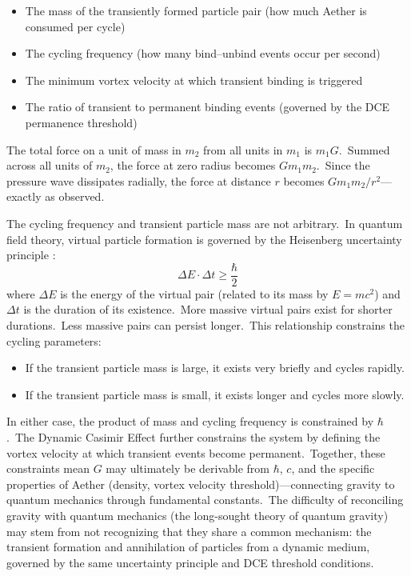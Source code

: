 ﻿\documentclass[12pt,letterpaper]{article}
\begin{document}
\begin{itemize}[leftmargin=2em]
  \item The mass of the transiently formed particle pair (how much Aether is consumed per cycle)
  \item The cycling frequency (how many bind--unbind events occur per second)
  \item The minimum vortex velocity at which transient binding is triggered
  \item The ratio of transient to permanent binding events (governed by the DCE permanence
    threshold)
\end{itemize}

The total force on a unit of mass in $m_2$ from all units in $m_1$ is $m_1 G$.\ Summed across
all units of $m_2$, the force at zero radius becomes $G m_1 m_2$.\ Since the pressure wave
dissipates radially, the force at distance $r$ becomes $Gm_1 m_2/r^2$---exactly as observed.

The cycling frequency and transient particle mass are not arbitrary.\ In quantum field
theory, virtual particle formation is governed by the Heisenberg uncertainty principle \cite{heisenberg1927}:
%
\begin{equation}
  \Delta E \cdot \Delta t \geq \frac{\hbar}{2}
\end{equation}
%
where $\Delta E$ is the energy of the virtual pair (related to its mass by $E = mc^2$) and
$\Delta t$ is the duration of its existence.\ More massive virtual pairs exist for shorter
durations.\ Less massive pairs can persist longer.\ This relationship constrains the cycling
parameters:

\begin{itemize}[leftmargin=2em]
  \item If the transient particle mass is large, it exists very briefly and cycles rapidly.
  \item If the transient particle mass is small, it exists longer and cycles more slowly.
\end{itemize}

In either case, the product of mass and cycling frequency is constrained by $\hbar$.\ The
Dynamic Casimir Effect further constrains the system by defining the vortex velocity at
which transient events become permanent.\ Together, these constraints mean $G$ may ultimately
be derivable from $\hbar$, $c$, and the specific properties of Aether (density, vortex
velocity threshold)---connecting gravity to quantum mechanics through fundamental constants.\ The
difficulty of reconciling gravity with quantum mechanics (the long-sought theory of quantum
gravity) may stem from not recognizing that they share a common mechanism: the transient
formation and annihilation of particles from a dynamic medium, governed by the same
uncertainty principle and DCE threshold conditions.
\end{document}
